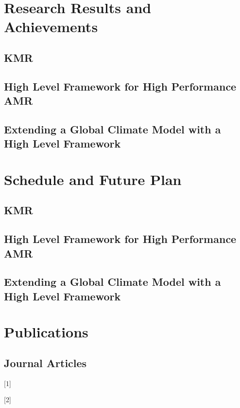 \documentclass{book}
\begin{document}
\section{Research Results and Achievements}

\subsection{KMR}

\subsection{High Level Framework for High Performance AMR}

\subsection{Extending a Global Climate Model with a High Level Framework}


\section{Schedule and Future Plan}

\subsection{KMR}

\subsection{High Level Framework for High Performance AMR}

\subsection{Extending a Global Climate Model with a High Level Framework}


\section{Publications}

\subsection{Journal Articles}

[1] 

[2]
\end{document}

